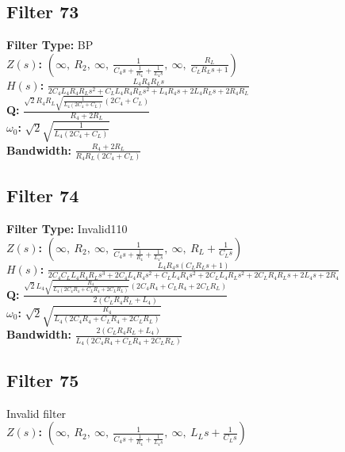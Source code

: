 \documentclass{article}
\begin{document}
\subsection*{Filter 73}
\textbf{Filter Type:} BP \\ 
\textbf{$Z(s)$:} $\left( \infty, \  R_{2}, \  \infty, \  \frac{1}{C_{4} s + \frac{1}{R_{4}} + \frac{1}{L_{4} s}}, \  \infty, \  \frac{R_{L}}{C_{L} R_{L} s + 1}\right)$ \\ 
\textbf{$H(s)$:} $\frac{L_{4} R_{4} R_{L} s}{2 C_{4} L_{4} R_{4} R_{L} s^{2} + C_{L} L_{4} R_{4} R_{L} s^{2} + L_{4} R_{4} s + 2 L_{4} R_{L} s + 2 R_{4} R_{L}}$ \\ 
\textbf{Q:} $\frac{\sqrt{2} R_{4} R_{L} \sqrt{\frac{1}{L_{4} \left(2 C_{4} + C_{L}\right)}} \left(2 C_{4} + C_{L}\right)}{R_{4} + 2 R_{L}}$ \\ 
\textbf{$\omega_0$:} $\sqrt{2} \sqrt{\frac{1}{L_{4} \left(2 C_{4} + C_{L}\right)}}$ \\ 
\textbf{Bandwidth:} $\frac{R_{4} + 2 R_{L}}{R_{4} R_{L} \left(2 C_{4} + C_{L}\right)}$ \\ 
\subsection*{Filter 74}
\textbf{Filter Type:} Invalid110 \\ 
\textbf{$Z(s)$:} $\left( \infty, \  R_{2}, \  \infty, \  \frac{1}{C_{4} s + \frac{1}{R_{4}} + \frac{1}{L_{4} s}}, \  \infty, \  R_{L} + \frac{1}{C_{L} s}\right)$ \\ 
\textbf{$H(s)$:} $\frac{L_{4} R_{4} s \left(C_{L} R_{L} s + 1\right)}{2 C_{4} C_{L} L_{4} R_{4} R_{L} s^{3} + 2 C_{4} L_{4} R_{4} s^{2} + C_{L} L_{4} R_{4} s^{2} + 2 C_{L} L_{4} R_{L} s^{2} + 2 C_{L} R_{4} R_{L} s + 2 L_{4} s + 2 R_{4}}$ \\ 
\textbf{Q:} $\frac{\sqrt{2} L_{4} \sqrt{\frac{R_{4}}{L_{4} \left(2 C_{4} R_{4} + C_{L} R_{4} + 2 C_{L} R_{L}\right)}} \left(2 C_{4} R_{4} + C_{L} R_{4} + 2 C_{L} R_{L}\right)}{2 \left(C_{L} R_{4} R_{L} + L_{4}\right)}$ \\ 
\textbf{$\omega_0$:} $\sqrt{2} \sqrt{\frac{R_{4}}{L_{4} \left(2 C_{4} R_{4} + C_{L} R_{4} + 2 C_{L} R_{L}\right)}}$ \\ 
\textbf{Bandwidth:} $\frac{2 \left(C_{L} R_{4} R_{L} + L_{4}\right)}{L_{4} \left(2 C_{4} R_{4} + C_{L} R_{4} + 2 C_{L} R_{L}\right)}$ \\ 
\subsection*{Filter 75}
Invalid filter \\ 
\textbf{$Z(s)$:} $\left( \infty, \  R_{2}, \  \infty, \  \frac{1}{C_{4} s + \frac{1}{R_{4}} + \frac{1}{L_{4} s}}, \  \infty, \  L_{L} s + \frac{1}{C_{L} s}\right)$ \\ 
\end{document}
